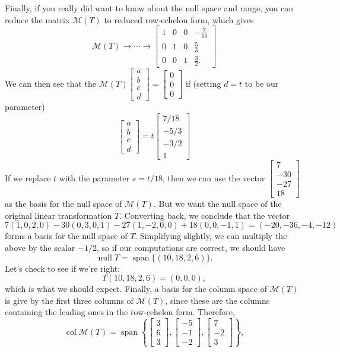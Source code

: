 \documentclass[12pt]{article}
\DeclareMathOperator{\nul}{null}
\DeclareMathOperator{\col}{col}
\DeclareMathOperator{\spn}{span}
\begin{document}
Finally, if you really did want to know about the null space and range, you can reduce the matrix $\mathcal{M}(T)$ to reduced row-echelon form, which gives
\[
 \mathcal{M}(T) \to \cdots \to \begin{bmatrix}1&0&0&-\frac{7}{18}\\0&1&0&\frac{5}{3}\\0&0&1&\frac{3}{2}.\end{bmatrix}
\]
We can then see that the $\mathcal{M}(T)\begin{bmatrix}a\\b\\c\\d\end{bmatrix} = \begin{bmatrix}0\\0\\0\end{bmatrix}$ if (setting $d=t$ to be our parameter)
\[
 \begin{bmatrix}a\\b\\c\\d\end{bmatrix} = t\begin{bmatrix}7/18\\-5/3\\-3/2\\1\end{bmatrix}
\]
If we replace $t$ with the parameter $s=t/18$, then we can use the vector $\begin{bmatrix}7\\-30\\-27\\18\end{bmatrix}$ as the basis for the null space of $\mathcal{M}(T)$. But we want the null space of the original linear transformation $T$. Converting back, we conclude that the vector
\[
 7(1,0,2,0)-30(0,3,0,1)-27(1,-2,0,0)+18(0,0,-1,1) = (-20,-36,-4,-12)
\]
forms a basis for the null space of $T$. Simplifying slightly, we can multiply the above by the scalar $-1/2$, so if our computations are correct, we should have
\[
 \nul T = \spn\{(10,18,2,6)\}.
\]
Let's check to see if we're right:
\[
 T(10,18,2,6) = (0,0,0),
\]
which is what we should expect. Finally, a basis for the column space of $\mathcal{M}(T)$ is give by the first three columns of $\mathcal{M}(T)$, since these are the columns containing the leading ones in the row-echelon form. Therefore,
\[
 \col \mathcal{M}(T) = \spn\left\{\begin{bmatrix}3\\6\\3\end{bmatrix},\begin{bmatrix}-5\\-1\\-2\end{bmatrix},\begin{bmatrix}7\\-2\\3\end{bmatrix}\right\},
\]
\end{document}
